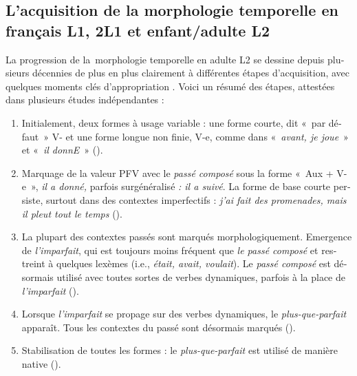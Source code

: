 \documentclass[french, output=paper]{langscibook}
\begin{document}
\begin{otherlanguage}{french}
\subsection{L’acquisition de la morphologie temporelle en français L1, 2L1 et enfant/adulte L2}\label{sec:kihlstedt:2.2}

La progression de la~morphologie temporelle en adulte L2 se dessine depuis plusieurs décennies de plus en plus clairement à différentes étapes d’acquisition, avec quelques moments clés d’appropriation \citep{Véronique2009}. Voici un résumé des étapes, attestées dans plusieurs études indépendantes :


\begin{enumerate}[label=\roman*.]
\item 
Initialement, deux formes à usage variable : une forme courte, dit «~par défaut~» V-  et une forme longue non finie, V-e, comme dans «~\textit{avant, je joue}~» et «~\textit{il donnE}~» (\citealt{DietrichEtAl1995, Schlyter1996, BartningSchlyter2004, Thomas2009}).

\item 
Marquage de la valeur PFV avec le \textit{passé composé} sous la forme «~Aux + V-e~», \textit{il a donné,} parfois surgénéralisé \textit{: il a suivé}. La forme de base courte persiste, surtout dans des contextes imperfectifs : \textit{j’ai fait des promenades, mais il pleut tout le temps} (\citealt{Schlyter1996, Kihlstedt2002, Giacolone-Ramat2002, Izquierdo2009}).

\item 
La plupart des contextes passés sont marqués morphologiquement. Emergence de \textit{l’imparfait}, qui est toujours moins fréquent que \textit{le passé composé} et restreint à quelques lexèmes (i.e., \textit{était, avait, voulait}).  Le \textit{passé composé} est désormais utilisé avec toutes sortes de verbes dynamiques, parfois à la place de \textit{l’imparfait} (\citealt{Devitt1992, Harley1992, Bergström1997, Ayoun2004, Kihlstedt2002, BenazzoStarren2007}).

\item\sloppy 
Lorsque \textit{l’imparfait} se propage sur des verbes dynamiques, le \textit{plus-que-parfait} apparaît. Tous les contextes du passé sont désormais marqués (\citealt{Schlyter1998, Kihlstedt2002, BenazzoStarren2007}).

\item 
Stabilisation de toutes les formes : le \textit{plus-que-parfait} est utilisé de manière native (\citealt{BartningSchlyter2004}).


\end{enumerate}
\end{otherlanguage}
\end{document}
